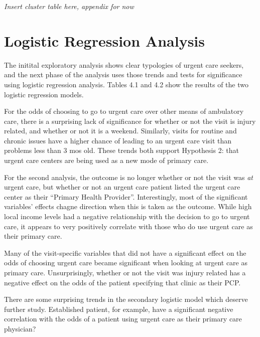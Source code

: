 \documentclass[12pt,twoside]{reedthesis}
\begin{document}
  \emph{Insert cluster table here, appendix for now}
  
  \section*{Logistic Regression
  Analysis}\label{logistic-regression-analysis}
  
  The initital exploratory analysis shows clear typologies of urgent care
  seekers, and the next phase of the analysis uses those trends and tests
  for significance using logistic regression analysis. Tables 4.1 and 4.2
  show the results of the two logistic regression models.
  
  For the odds of choosing to go to urgent care over other means of
  ambulatory care, there is a surprising lack of significance for whether
  or not the visit is injury related, and whether or not it is a weekend.
  Similarly, visits for routine and chronic issues have a higher chance of
  leading to an urgent care visit than problems less than 3 mos old. These
  trends both support Hypothesis 2: that urgent care centers are being
  used as a new mode of primary care.
  
  For the second analysis, the outcome is no longer whether or not the
  visit was \emph{at} urgent care, but whether or not an urgent care
  patient listed the urgent care center as their ``Primary Health
  Provider''. Interestingly, most of the significant variables' effects
  chagne direction when this is taken as the outcome. While high local
  income levels had a negative relationship with the decision to go to
  urgent care, it appears to very positively correlate with those who do
  use urgent care as their primary care.
  
  Many of the visit-specific variables that did not have a significant
  effect on the odds of choosing urgent care became significant when
  looking at urgent care as primary care. Unsurprisingly, whether or not
  the visit was injury related has a negative effect on the odds of the
  patient specifying that clinic as their PCP.
  
  There are some surprising trends in the secondary logistic model which
  deserve further study. Established patient, for example, have a
  significant negative correlation with the odds of a patient using urgent
  care as their primary care physician?
  
\end{document}
